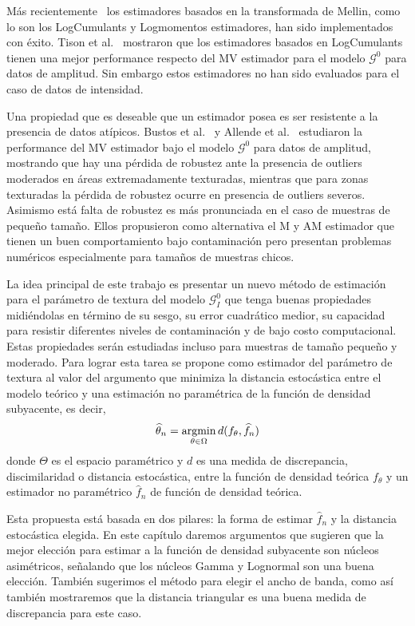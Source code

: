 Más recientemente~\cite{MellinAnalysisPolSAR,BujorTrouveValetNicolas2004,khan2014} los estimadores basados en la transformada de Mellin, como lo son los LogCumulants y Logmomentos estimadores, han sido implementados con éxito. Tison et al.~\cite{Tison2004} mostraron que los estimadores basados en LogCumulants tienen una mejor performance respecto del MV estimador para el modelo $\mathcal G^0$ para datos de amplitud. Sin embargo estos estimadores no han sido evaluados para el caso de datos de intensidad.

Una propiedad que es deseable que un estimador posea es ser resistente a la presencia de datos atípicos. Bustos et al.~\cite{BustosFreryLucini:Mestimators:2001} y Allende et al.~\cite{AllendeFreryetal:JSCS:05} estudiaron la performance del MV estimador bajo el modelo $\mathcal{G}^{0}$ para datos de amplitud, mostrando que hay una pérdida de robustez ante la presencia de outliers moderados en áreas extremadamente texturadas, mientras que para zonas texturadas la pérdida de robustez ocurre en presencia de outliers severos. Asimismo está falta de robustez es más pronunciada en el caso de muestras de pequeño tamaño. Ellos propusieron como alternativa el M y AM estimador que tienen un buen comportamiento bajo contaminación pero presentan problemas numéricos especialmente para tamaños de muestras chicos.

La idea principal de este trabajo es presentar un nuevo método de estimación para el parámetro de textura del modelo $\mathcal{G}_I^0$ que tenga  buenas propiedades midiéndolas en término de su sesgo, su error cuadrático medior, su capacidad para resistir diferentes niveles de contaminación y de bajo costo computacional. Estas propiedades serán estudiadas incluso para muestras de tamaño pequeño y moderado. Para lograr esta tarea se propone como estimador del parámetro de textura al valor del argumento que minimiza la distancia estocástica entre el modelo teórico y una estimación no paramétrica de la función de densidad subyacente, es decir,
\begin{align}
\widehat{\theta}_n=\mathop{\rm argmin} \limits_{\theta\in\Omega} d(f_{\theta}, \widehat{f}_n)
\end{align}
donde $\Theta$ es el espacio paramétrico y $d$ es una medida de discrepancia, discimilaridad o distancia estocástica, entre la función de densidad teórica $f_{\theta}$ y un estimador no paramétrico $\widehat{f}_n$ de función de densidad teórica.

Esta propuesta está basada en dos pilares: la forma de estimar $\widehat{f}_n$ y la distancia estocástica elegida. En este capítulo daremos argumentos que sugieren que la mejor elección para estimar a la función de densidad subyacente son núcleos asimétricos, señalando que los núcleos Gamma y Lognormal son una buena elección. También sugerimos el método para elegir el ancho de banda, como así también mostraremos que la distancia triangular es una buena medida de discrepancia para este caso.

